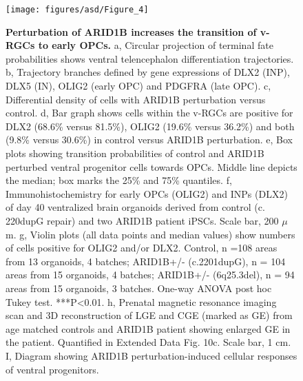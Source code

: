 \begin{figure}[b!]
    \centering
	\texttt{[image: figures/asd/Figure\_4]}
    \caption{\textbf{Perturbation of ARID1B increases the transition of v-RGCs to early OPCs.}
    a, Circular projection of terminal fate probabilities shows ventral telencephalon differentiation trajectories. b, Trajectory branches defined by gene expressions of DLX2 (INP), DLX5 (IN), OLIG2 (early OPC) and PDGFRA (late OPC). c, Differential density of cells with ARID1B perturbation versus control. d, Bar graph shows cells within the v-RGCs are positive for DLX2 (68.6\% versus 81.5\%), OLIG2 (19.6\% versus 36.2\%) and both (9.8\% versus 30.6\%) in control versus ARID1B perturbation. e, Box plots showing transition probabilities of control and ARID1B perturbed ventral progenitor cells towards OPCs. Middle line depicts the median; box marks the 25\% and 75\% quantiles. f, Immunohistochemistry for early OPCs (OLIG2) and INPs (DLX2) of day 40 ventralized brain organoids derived from control (c. 220dupG repair) and two ARID1B patient iPSCs. Scale bar, 200 $\mu$m. g, Violin plots (all data points and median values) show numbers of cells positive for OLIG2 and/or DLX2. Control, n =108 areas from 13 organoids, 4 batches; ARID1B+/- (c.2201dupG), n = 104 areas from 15 organoids, 4 batches; ARID1B+/- (6q25.3del), n = 94 areas from 15 organoids, 3 batches. One-way ANOVA post hoc Tukey test. ***P<0.01. h, Prenatal magnetic resonance imaging scan and 3D reconstruction of LGE and CGE (marked as GE) from age matched controls and ARID1B patient showing enlarged GE in the patient. Quantified in Extended Data Fig. 10c. Scale bar, 1 cm. I, Diagram showing ARID1B perturbation-induced cellular responses of ventral progenitors.}
    \label{fig:asd4}
\end{figure}


